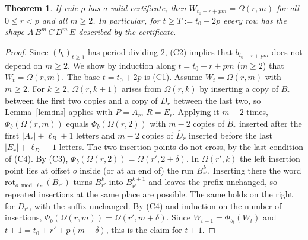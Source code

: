 \documentclass[11pt]{article}
\newtheorem{theorem}{Theorem}
\theoremstyle{definition}
\theoremstyle{remark}
\begin{document}
\begin{theorem}\label{thm:cert}
If rule $\rho$ has a valid certificate, then $W_{t_0+r+pm}=\Omega(r,m)$ for all $0\le r<p$ and all $m\ge2$. In particular, for $t\ge T:=t_0+2p$ every row has the shape $A\,B^m\,C\,D^m\,E$ described by the certificate.
\end{theorem}
\begin{proof}
Since $(b_t)_{t\ge1}$ has period dividing $2$, (C2) implies that $b_{t_0+r+pm}$ does not depend on $m\ge2$. We show by induction along $t=t_0+r+pm$ ($m\ge2$) that $W_t=\Omega(r,m)$. The base $t=t_0+2p$ is (C1). Assume $W_t=\Omega(r,m)$ with $m\ge2$. For $k\ge2$, $\Omega(r,k+1)$ arises from $\Omega(r,k)$ by inserting a copy of $B_r$ between the first two copies and a copy of $D_r$ between the last two, so Lemma~\ref{lem:ins} applies with $P=A_r$, $R=E_r$. Applying it $m-2$ times, $\Phi_b(\Omega(r,m))$ equals $\Phi_b(\Omega(r,2))$ with $m-2$ copies of $\widetilde{B_r}$ inserted after the first $|A_r|+\ell_B+1$ letters and $m-2$ copies of $\widetilde{D_r}$ inserted before the last $|E_r|+\ell_D+1$ letters. The two insertion points do not cross, by the last condition of (C4). By (C3), $\Phi_b(\Omega(r,2))=\Omega(r',2+\delta)$. In $\Omega(r',k)$ the left insertion point lies at offset $o$ inside (or at an end of) the run $B_{r'}^k$. Inserting there the word $\mathrm{rot}_{o\bmod\ell_B}(B_{r'})$ turns $B_{r'}^k$ into $B_{r'}^{k+1}$ and leaves the prefix unchanged, so repeated insertions at the same place are possible. The same holds on the right for $D_{r'}$, with the suffix unchanged. By (C4) and induction on the number of insertions, $\Phi_b(\Omega(r,m))=\Omega(r',m+\delta)$. Since $W_{t+1}=\Phi_{b_t}(W_t)$ and $t+1=t_0+r'+p(m+\delta)$, this is the claim for $t+1$.
\end{proof}
\end{document}
